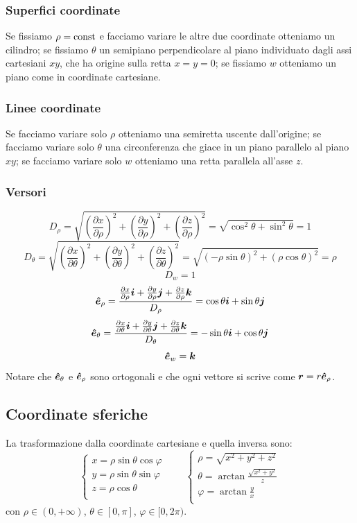 \subsubsection{Superfici coordinate}
Se fissiamo $\rho=\text{const}$ e facciamo variare le altre due coordinate otteniamo un cilindro; se fissiamo $\theta$ un semipiano perpendicolare al piano individuato dagli assi cartesiani $xy$, che ha origine sulla retta $x=y=0$; se fissiamo $w$ otteniamo un piano come in coordinate cartesiane.

\subsubsection{Linee coordinate}
Se facciamo variare solo $\rho$ otteniamo una semiretta uscente dall'origine; se facciamo variare solo $\theta$ una circonferenza che giace in un piano parallelo al piano $xy$; se facciamo variare solo $w$ otteniamo una retta parallela all'asse $z$.

\subsubsection{Versori}
\[D_\rho=\sqrt{\left(\frac{\partial x}{\partial\rho}\right)^2+\left(\frac{\partial y}{\partial \rho}\right)^2+\left(\frac{\partial z}{\partial \rho}\right)^2}=\sqrt{\cos^2\theta+\sin^2\theta}=1\]
\[D_\theta=\sqrt{\left(\frac{\partial x}{\partial\theta}\right)^2+\left(\frac{\partial y}{\partial \theta}\right)^2+\left(\frac{\partial z}{\partial \theta}\right)^2}=\sqrt{\left(-\rho\sin\theta\right)^2+\left(\rho\cos\theta\right)^2}=\rho\]
\[D_w=1\]
\[\boldsymbol{\hat {e}}_\rho=\frac{\frac{\partial x}{\partial\rho}\boldsymbol{i}+\frac{\partial y}{\partial\rho}\boldsymbol{j}+\frac{\partial z}{\partial\rho}\boldsymbol{k}}{D_\rho}=\cos\theta\boldsymbol{i}+\sin\theta\boldsymbol{j}\]
\[\boldsymbol{\hat {e}}_\theta=\frac{\frac{\partial x}{\partial\theta}\boldsymbol{i}+\frac{\partial y}{\partial\theta}\boldsymbol{j}+\frac{\partial z}{\partial\theta}\boldsymbol{k}}{D_\theta}=-\sin\theta\boldsymbol{i}+\cos\theta\boldsymbol{j}\]
\[\boldsymbol{\hat {e}}_w=\boldsymbol{k}\]
Notare che $\boldsymbol{\hat {e}}_\theta$ e $\boldsymbol{\hat {e}}_\rho$ sono ortogonali e che ogni vettore si scrive come $\boldsymbol{r}=r\boldsymbol{\hat {e}}_\rho$.

\subsection{Coordinate sferiche}
La trasformazione dalla coordinate cartesiane e quella inversa sono:
\[\left\{\begin{array}{l}
    x=\rho\sin\theta\cos\varphi \\
    y=\rho\sin\theta\sin\varphi \\
    z=\rho\cos\theta            \\
  \end{array}\right.
  \qquad
  \left\{\begin{array}{l}
    \rho=\sqrt{x^2+y^2+z^2}                \\
    \theta=\arctan\frac{\sqrt{x^2+y^2}}{z} \\
    \varphi=\arctan\frac{y}{x}             \\
  \end{array}\right.
\]
con $\rho\in(0,+\infty)$, $\theta\in[0,\pi]$, $\varphi\in[0,2\pi)$.

